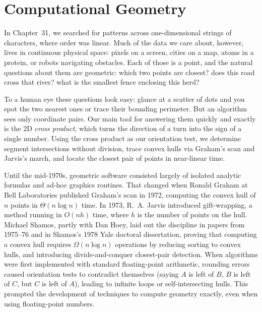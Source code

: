 \chapter{Computational Geometry}
\label{ch32:geom}

In Chapter~31, we searched for patterns across one-dimensional strings of characters, where order was linear. Much of the data we care about, however, lives in continuous physical space: pixels on a screen, cities on a map, atoms in a protein, or robots navigating obstacles. Each of those is a point, and the natural questions about them are geometric: which two points are closest? does this road cross that river? what is the smallest fence enclosing this herd?

To a human eye these questions look easy: glance at a scatter of dots and you spot the two nearest ones or trace their bounding perimeter. But an algorithm sees only coordinate pairs. Our main tool for answering them quickly and exactly is the 2D \emph{cross product}, which turns the direction of a turn into the sign of a single number. Using the cross product as our orientation test, we determine segment intersections without division, trace convex hulls via Graham's scan and Jarvis's march, and locate the closest pair of points in near-linear time.

\begin{historybox}
Until the mid-1970s, geometric software consisted largely of isolated analytic formulas and ad-hoc graphics routines. That changed when Ronald Graham at Bell Laboratories published Graham's scan in 1972, computing the convex hull of $n$ points in $\Theta(n \log n)$ time. In 1973, R.~A. Jarvis introduced gift-wrapping, a method running in $O(nh)$ time, where $h$ is the number of points on the hull. Michael Shamos, partly with Dan Hoey, laid out the discipline in papers from 1975--76 and in Shamos's 1978 Yale doctoral dissertation, proving that computing a convex hull requires $\Omega(n \log n)$ operations by reducing sorting to convex hulls, and introducing divide-and-conquer closest-pair detection. When algorithms were first implemented with standard floating-point arithmetic, rounding errors caused orientation tests to contradict themselves (saying $A$ is left of $B$, $B$ is left of $C$, but $C$ is left of $A$), leading to infinite loops or self-intersecting hulls. This prompted the development of techniques to compute geometry exactly, even when using floating-point numbers.
\end{historybox}

